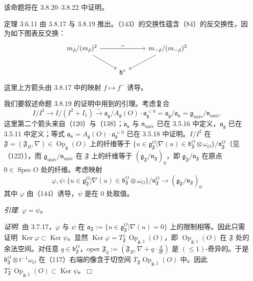 该命题将在 3.8.20--3.8.22 中证明。

定理 3.6.11 由 3.8.17 与 3.8.19 推出。（143）的交换性蕴含（84）的反交换性，因为如下图表反交换：
\[
\begin{tikzcd}
  m_{\check\rho}/(m_{\check\rho})^{2} \arrow[rr, "\sim"] \arrow[dr] & & m_{-\check\rho}/(m_{-\check\rho})^{2} \arrow[dl] \\
  & \mathfrak{h}^{*} &
\end{tikzcd}
\]
这里上方箭头由 3.8.17 中的映射 $f\mapsto f^{-}$ 诱导。

 我们要叙述命题 3.8.19 的证明中用到的引理。考虑复合
\begin{equation}\tag{144}
  I/I^{2}\to I/(I^{2}+I_{1})\xrightarrow{\sim}\mathfrak{a}_{\mathfrak{g}}/A_{\mathfrak{g}}(O)\cdot\mathfrak{a}_{\mathfrak{g}}^{<0}
  =\mathfrak{a}_{\mathfrak{g}}/\mathfrak{a}_{\mathfrak{n}}=\mathfrak{g}_{\mathrm{univ}}/\mathfrak{n}_{\mathrm{univ}}.
\end{equation}
这里第二个箭头来自（120）与（138）；$\mathfrak{a}_{\mathfrak{n}}$ 与 $\mathfrak{n}_{\mathrm{univ}}$ 已在 3.5.16 中定义，$\mathfrak{a}_{\mathfrak{g}}$ 已在 3.5.11 中定义；等式 $\mathfrak{a}_{\mathfrak{n}}=A_{\mathfrak{g}}(O)\cdot\mathfrak{a}_{\mathfrak{g}}^{<0}$ 已在 3.5.18 中证明。$I/I^{2}$ 在 $\mathfrak{F}=(\mathfrak{F}_{B},\nabla)\in\operatorname{Op}_{\mathfrak{g}}(O)$ 上的纤维等于 $\{u\in\mathfrak{g}^{O}_{\mathfrak{F}}|\nabla(u)\in\mathfrak{b}^{O}_{\mathfrak{F}}\otimes\omega_{O}\}/\mathfrak{n}^{O}_{\mathfrak{F}}$（见（122）），而 $\mathfrak{g}_{\mathrm{univ}}/\mathfrak{n}_{\mathrm{univ}}$ 在 $\mathfrak{F}$ 上的纤维等于 $(\mathfrak{g}_{\mathfrak{F}}/\mathfrak{n}_{\mathfrak{F}})_{0}$，即 $\mathfrak{g}_{\mathfrak{F}}/\mathfrak{n}_{\mathfrak{F}}$ 在原点 $0\in\operatorname{Spec}O$ 处的纤维。考虑映射
\[
\varphi,\psi:\{u\in\mathfrak{g}^{O}_{\mathfrak{F}}|\nabla(u)\in\mathfrak{b}^{O}_{\mathfrak{F}}\otimes\omega_{O}\}/\mathfrak{n}^{O}_{\mathfrak{F}}
  \to(\mathfrak{g}_{\mathfrak{F}}/\mathfrak{n}_{\mathfrak{F}})_{0}
\]
其中 $\varphi$ 由（144）诱导，$\psi$ 是在 $0$ 处取值。

 \emph{引理.} $\varphi=\psi$。

\emph{证明.} 由 3.7.17，$\varphi$ 与 $\psi$ 在 $\mathfrak{a}_{\mathfrak{F}}:=\{u\in\mathfrak{g}^{O}_{\mathfrak{F}}|\nabla(u)=0\}$ 上的限制相等。因此只需证明 $\operatorname{Ker}\varphi\subset\operatorname{Ker}\psi$。显然 $\operatorname{Ker}\varphi=T^{\perp}_{\mathfrak{F}}\operatorname{Op}_{\mathfrak{g},1}(O)$，即 $\operatorname{Op}_{\mathfrak{g},1}(O)$ 在 $\mathfrak{F}$ 处的余法空间。对任意 $q\in\mathfrak{b}^{O}_{\mathfrak{F}}$，oper $\mathfrak{F}_{q}:=(\mathfrak{F}_{B},\nabla+q\cdot\frac{d}{dt})$ 是 $(\le 1)$-奇异的。于是 $\mathfrak{b}^{O}_{\mathfrak{F}}\otimes t^{-1}\omega_{O}$ 在（117）右端的像含于切空间 $T_{\mathfrak{F}}\operatorname{Op}_{\mathfrak{g},1}(O)$ 中。因此 $T^{\perp}_{\mathfrak{F}}\operatorname{Op}_{\mathfrak{g},1}(O)\subset\operatorname{Ker}\psi$。\hfill$\Box$

